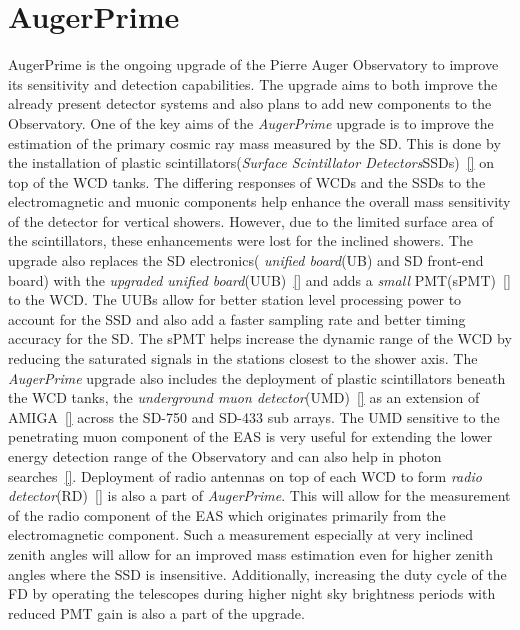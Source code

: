 \section{AugerPrime}
\label{sec:Aug_prime}
AugerPrime is the ongoing upgrade of the Pierre Auger Observatory to improve its sensitivity and detection capabilities. The upgrade aims to both improve the already present detector systems and also plans to add new components to the Observatory. One of the key aims of the \textit{AugerPrime} upgrade is to improve the estimation of the primary cosmic ray mass measured by the SD. This is done by the installation of plastic scintillators(\textit{Surface Scintillator Detectors}SSDs)~\ref{} on top of the WCD tanks. The differing responses of WCDs and the SSDs to the electromagnetic and muonic components help enhance the overall mass sensitivity of the detector for vertical showers. However, due to the limited surface area of the scintillators, these enhancements were lost for the inclined showers. The upgrade also replaces the SD electronics( \textit{unified board}(UB) and SD front-end board) with the \textit{upgraded unified board}(UUB)~\ref{} and adds a \textit{small} PMT(sPMT)~\ref{} to the WCD. The UUBs allow for better station level processing power to account for the SSD and also add a faster sampling rate and better timing accuracy for the SD. The sPMT helps increase the dynamic range of the WCD by reducing the saturated signals in the stations closest to the shower axis. The \textit{AugerPrime} upgrade also includes the deployment of plastic scintillators beneath the WCD tanks, the \textit{underground muon detector}(UMD)~\ref{} as an extension of AMIGA~\ref{} across the SD-750 and SD-433 sub arrays. The UMD sensitive to the penetrating muon component of the EAS is very useful for extending the lower energy detection range of the Observatory and can also help in photon searches~\ref{}. Deployment of radio antennas on top of each WCD to form \textit{radio detector}(RD)~\ref{} is also a part of \textit{AugerPrime}. This will allow for the measurement of the radio component of the EAS which originates primarily from the electromagnetic component. Such a measurement especially at very inclined zenith angles will allow for an improved mass estimation even for higher zenith angles where the SSD is insensitive. Additionally, increasing the duty cycle of the FD by operating the telescopes during higher night sky brightness periods with reduced PMT gain is also a part of the upgrade. 

